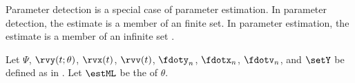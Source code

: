 Parameter detection is a special case of parameter estimation.
In parameter detection, the estimate is a member of an finite set.
In parameter estimation, the estimate is a member of an infinite set
.

\begin{theorem}
\label{thm:estML_general}
\label{thm:ml_est_det}
Let $\Psi$, $\rvy(t;\theta)$, $\rvx(t)$, $\rvv(t)$, $\fdoty_n$, $\fdotx_n$, $\fdotv_n$, and $\setY$ be defined as in .
Let $\estML$  be the   of $\theta$.
\end{theorem}
